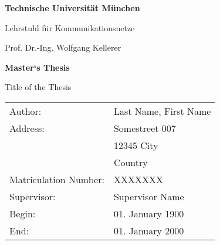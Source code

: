 \documentclass[12pt,a4paper]{report}
\begin{document}
\thispagestyle{empty}
\newpage

\vspace{5cm}
\begin{center}
    \epsfxsize=4cm
\end{center}

\parbox{15cm}{\begin{center} {\sf\bf 
                               \Large  Technische Universität München
                                \smallskip

                               \Large Lehrstuhl für Kommunikationsnetze
                               \smallskip
                              }

                              {\sf \large Prof. Dr.-Ing. Wolfgang Kellerer} 
              \end{center}}  %

\vspace{4cm}

\begin{center}
        {\bf\Huge Master‘s Thesis} %
\end{center}

\begin{center}
        \settowidth{\baselineskip}{0.4cm}
        {\LARGE 
        Title of the Thesis
        }
\end{center}

\vfill         
{\settowidth{\baselineskip}{0.2cm}
\large\begin{tabular}[l]{ll}
Author: & Last Name, First Name\\
Address: & Somestreet 007\\
         & 12345 City\\
         & Country\\
Matriculation Number: & XXXXXXX\\
Supervisor: & Supervisor Name\\
Begin: & 01. January 1900\\
End: & 01. January 2000
\end{tabular}}





\tableofcontents  

\end{document}
